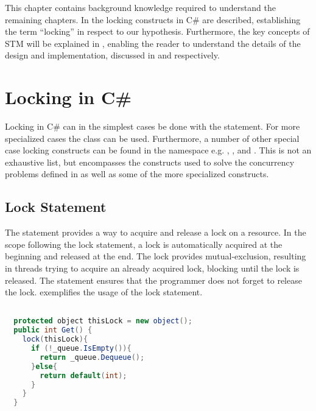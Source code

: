 \makeatletter {}\makeatother
{}
This chapter contains background knowledge required to understand the remaining chapters. In  the locking constructs in C\# are described, establishing the term ``locking''  in respect to our hypothesis. Furthermore, the key concepts of \ac{STM} will be explained in , enabling the reader to understand the details of the design and implementation, discussed in  and  respectively.
\label{chap:prelim}
\section{Locking in C\#}\label{sec:locking}
Locking in C\# can in the simplest cases be done with the  statement. For more specialized cases the  class can be used. Furthermore, a number of other special case locking constructs can be found in the  namespace e.g. \cite{microsoftSyncPrim} , ,  and . This is not an exhaustive list, but encompasses the constructs used to solve the concurrency problems defined in  as well as some of the more specialized constructs.
\subsection{Lock Statement}\label{subsec:lock_statement}
The  statement\cite[p. 102]{csharp2013specificaiton} provides a way to acquire and release a lock on a resource. In the scope following the lock statement, a lock is automatically acquired at the beginning and released at the end. The lock provides mutual-exclusion, resulting in threads trying to acquire an already acquired lock, blocking until the lock is released. The  statement ensures that the programmer does not forget to release the lock.  exemplifies the usage of the lock statement.
\begin{lstlisting}[label=lst:lock_statement,
 caption={Lock Statement},
 language=Java, 
 showspaces=false,
 showtabs=false,
 breaklines=true,
 showstringspaces=false,
 breakatwhitespace=true,
 commentstyle=\color{greencomments},
 keywordstyle=\color{bluekeywords},
 stringstyle=\color{redstrings},
 morekeywords={atomic, retry, orElse, lock, object}]  % Start your code-block

  protected object thisLock = new object();
  public int Get() {
    lock(thisLock){
      if (!_queue.IsEmpty()){
        return _queue.Dequeue();
      }else{
        return default(int);
      }
    }
  }
\end{lstlisting}
